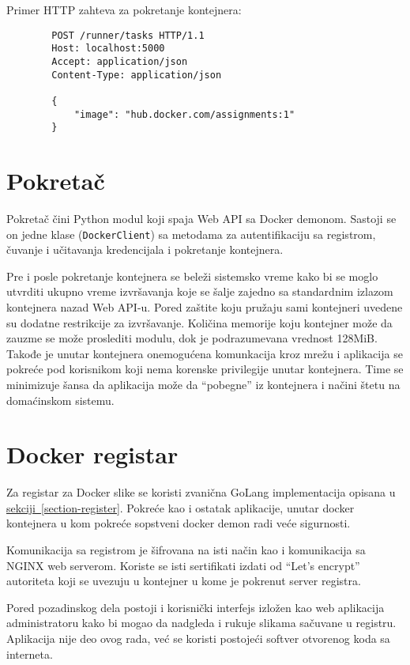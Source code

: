 \documentclass[12pt]{report}
\begin{document}
Primer \acrshort{HTTP} zahteva za pokretanje kontejnera:
\begin{samepage}
    \begin{verbatim}
        POST /runner/tasks HTTP/1.1
        Host: localhost:5000
        Accept: application/json
        Content-Type: application/json

        {
            "image": "hub.docker.com/assignments:1"
        }
    \end{verbatim}
\end{samepage}

\section{Pokretač}
Pokretač čini Python modul koji spaja Web API sa Docker demonom. Sastoji se on jedne klase (\texttt{DockerClient}) sa metodama za autentifikaciju sa registrom, čuvanje i učitavanja kredencijala i pokretanje kontejnera.

Pre i posle pokretanje kontejnera se beleži sistemsko vreme kako bi se moglo utvrditi ukupno vreme izvršavanja koje se šalje zajedno sa standardnim izlazom kontejnera nazad Web API-u. Pored zaštite koju pružaju sami kontejneri uvedene su dodatne restrikcije za izvršavanje. Količina memorije koju kontejner može da zauzme se može proslediti modulu, dok je podrazumevana vrednost 128MiB. Takođe je unutar kontejnera onemogućena komunkacija kroz mrežu i aplikacija se pokreće pod korisnikom koji nema korenske privilegije unutar kontejnera. Time se minimizuje šansa da aplikacija može da ``pobegne'' iz kontejnera i načini štetu na domaćinskom sistemu.

\section{Docker registar}
Za registar za Docker slike se koristi zvanična GoLang implementacija opisana u \hyperref[section-register]{sekciji~\ref*{section-register}}. Pokreće kao i ostatak aplikacije, unutar docker kontejnera u kom pokreće sopstveni docker demon radi veće sigurnosti.

Komunikacija sa registrom je šifrovana na isti način kao i komunikacija sa NGINX web serverom. Koriste se isti sertifikati izdati od ``Let's encrypt'' autoriteta koji se uvezuju u kontejner u kome je pokrenut server registra.

Pored pozadinskog dela postoji i korisnički interfejs izložen kao web aplikacija administratoru kako bi mogao da nadgleda i rukuje slikama sačuvane u registru. Aplikacija nije deo ovog rada, već se koristi postojeći softver otvorenog koda sa interneta.
\end{document}
